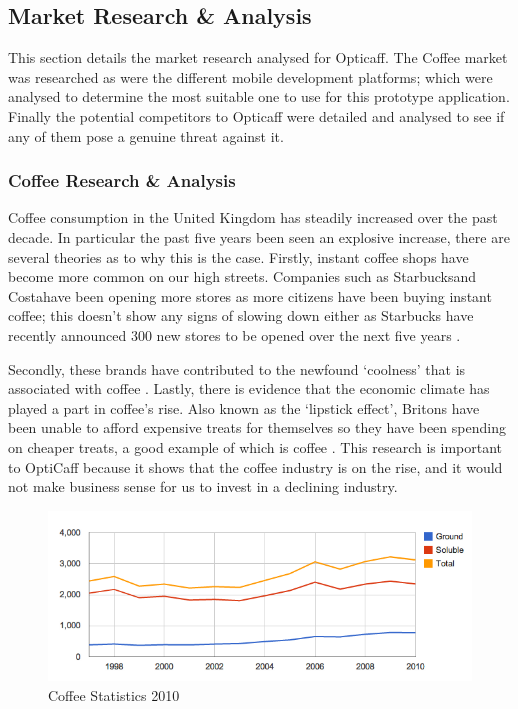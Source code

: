 \subsection{Market Research \& Analysis}
This section details the market research analysed for Opticaff.
The Coffee market was researched as were the different mobile development platforms; which were analysed to determine the most suitable one to use for this prototype application. 
Finally the potential competitors to Opticaff were detailed and analysed to see if any of them pose a genuine threat against it. 

\subsubsection{Coffee Research \& Analysis}
Coffee consumption in the United Kingdom has steadily increased over the past decade. 
In particular the past five years been seen an explosive increase, there are several theories as to why this is the case.
Firstly, instant coffee shops have become more common on our high streets. 
Companies such as Starbucks\texttrademark and Costa\texttrademark have been opening more stores as more citizens have been buying instant coffee; this doesn’t show any signs of slowing down either as Starbucks have recently announced 300 new stores to be opened over the next five years \cite{starbucks}.

Secondly, these brands have contributed to the newfound ‘coolness’ that is associated with coffee \cite{popular}. 
Lastly, there is evidence that the economic climate has played a part in coffee’s rise. 
Also known as the ‘lipstick effect’, Britons have been unable to afford expensive treats for themselves so they have been spending on cheaper treats, a good example of which is coffee \cite{costa}.
This research is important to OptiCaff because it shows that the coffee industry is on the rise, and it would not make business sense for us to invest in a declining industry.

\begin{figure}[ht]
\begin{center}
\includegraphics[trim = 0mm 0mm 0mm 0mm, clip, scale=0.6]{images/CaffeineGraph.png}
\caption{Coffee Statistics 2010 \cite{CoffeeStats}} 
\end{center}
\end{figure}

